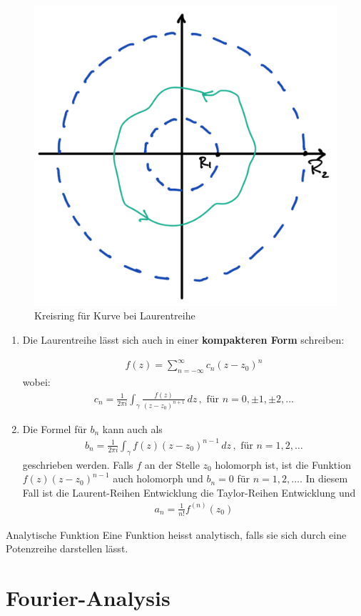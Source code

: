 \documentclass[a4paper,10pt]{article}
\begin{document}
\begin{figure}[H]
  \centering 
  \includegraphics[width=0.4\linewidth]{assets/4-1-1.png}
  \caption{Kreisring für Kurve bei Laurentreihe}
\end{figure}

\begin{enumerate}
  \item{
    Die Laurentreihe lässt sich auch in einer \textbf{kompakteren Form} schreiben:

    \begin{align*} 
       f(z) = \sum_{n=-\infty}^{\infty} c_n (z-z_0)^n
     \end{align*}
     wobei:
     \begin{align*}
      c_n=\frac{1}{2\pi i}\int_\gamma\frac{f(z)}{(z-z_0)^{n+1}}\,dz\,,\text{ für } n=0,\pm1,\pm2,\dots
    \end{align*}
  }

  \item{
    Die Formel für \(b_n\) kann auch als 
    \begin{align*} b_n=\frac{1}{2\pi i}\int_\gamma f(z)(z-z_0)^{n-1}\,dz\,,\text{ für } n=1,2,\dots \end{align*} geschrieben werden. Falls \(f\) an der Stelle \(z_0\) holomorph ist, ist die Funktion \(f(z)(z-z_0)^{n-1}\) auch holomorph und \(b_n=0\) für \(n=1,2,\dots\). In diesem Fall ist die Laurent-Reihen Entwicklung die Taylor-Reihen Entwicklung und \begin{align*} a_n=\frac{1}{n!}f^{( n )}(z_0) \end{align*}
  }
\end{enumerate}

\begin{subbox}{Analytische Funktion}
  Eine Funktion heisst analytisch, falls sie sich durch eine Potenzreihe darstellen lässt.
\end{subbox}



\section{Fourier-Analysis}
\end{document}

